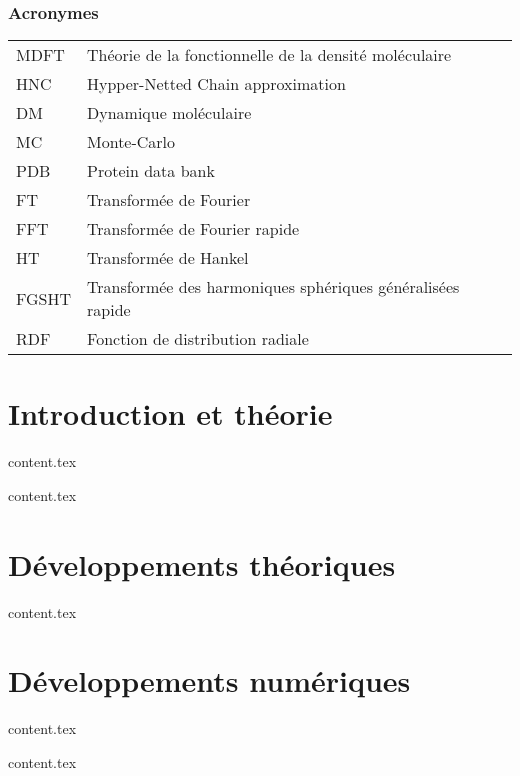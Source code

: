 \documentclass{bredele}
\begin{document}
\section*{Acronymes}
\begin{tabular}{ll}
MDFT & Théorie de la fonctionnelle de la densité moléculaire\\
HNC & Hypper-Netted Chain approximation\\
DM & Dynamique moléculaire \\
MC & Monte-Carlo \\
PDB & Protein data bank \\
FT & Transformée de Fourier \\
FFT & Transformée de Fourier rapide \\
HT & Transformée de Hankel \\
FGSHT & Transformée des harmoniques sphériques généralisées rapide \\
RDF & Fonction de distribution radiale\\
\end{tabular}







\clearemptydoublepage
\mainmatter

\part{Introduction et théorie}

\clearemptydoublepage
{content.tex}

\clearemptydoublepage
{content.tex}

\part{Développements théoriques}

\clearemptydoublepage
{content.tex}

\part{Développements numériques}

\clearemptydoublepage
{content.tex}


\clearemptydoublepage
{content.tex}
\end{document}
